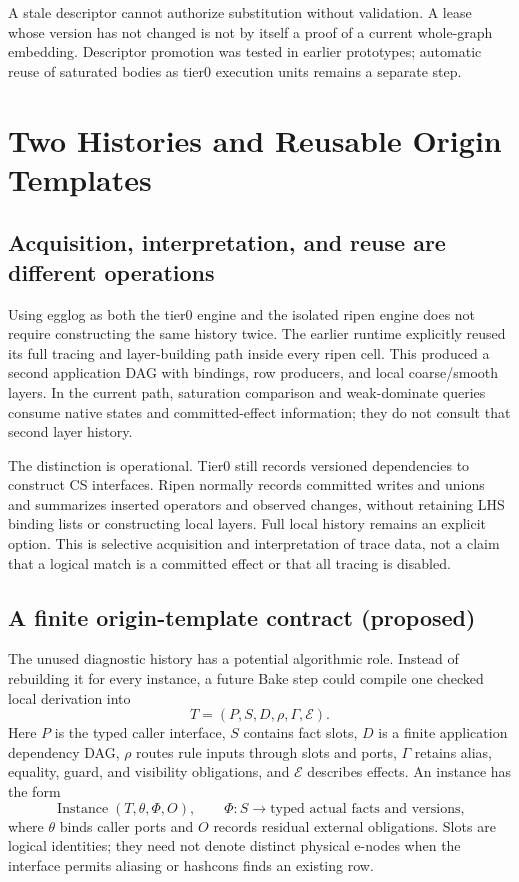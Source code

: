 \documentclass[11pt,a4paper]{article}
\begin{document}
A stale descriptor cannot authorize substitution without validation. A lease
whose version has not changed is not by itself a proof of a current whole-graph
embedding. Descriptor promotion was tested in earlier prototypes; automatic
reuse of saturated bodies as tier0 execution units remains a separate step.

\MathVisibility

\section{Two Histories and Reusable Origin Templates}
\label{sec:origin-templates}
\subsection{Acquisition, interpretation, and reuse are different operations}
Using egglog as both the tier0 engine and the isolated ripen engine does not
require constructing the same history twice. The earlier runtime explicitly
reused its full tracing and layer-building path inside every ripen cell. This
produced a second application DAG with bindings, row producers, and local
coarse/smooth layers. In the current path, saturation comparison and
weak-dominate queries consume native states and committed-effect information;
they do not consult that second layer history.

The distinction is operational. Tier0 still records versioned dependencies to
construct CS interfaces. Ripen normally records committed writes and unions and
summarizes inserted operators and observed changes, without retaining LHS binding
lists or constructing local layers. Full local history remains an explicit
option. This is selective acquisition and interpretation of trace data, not a
claim that a logical match is a committed effect or that all tracing is disabled.
\HistoryModesFigure

\subsection{A finite origin-template contract (proposed)}
The unused diagnostic history has a potential algorithmic role. Instead of
rebuilding it for every instance, a future Bake step could compile one checked
local derivation into
\begin{equation}
 T=(P,S,D,\rho,\Gamma,\mathcal E).
\end{equation}
Here $P$ is the typed caller interface, $S$ contains fact slots, $D$ is a finite
application dependency DAG, $\rho$ routes rule inputs through slots and ports,
$\Gamma$ retains alias, equality, guard, and visibility obligations, and
$\mathcal E$ describes effects. An instance has the form
\begin{equation}
 \operatorname{Instance}(T,\theta,\Phi,O),
 \qquad \Phi:S\longrightarrow\text{typed actual facts and versions},
\end{equation}
where $\theta$ binds caller ports and $O$ records residual external obligations.
Slots are logical identities; they need not denote distinct physical e-nodes
when the interface permits aliasing or hashcons finds an existing row.
\end{document}
